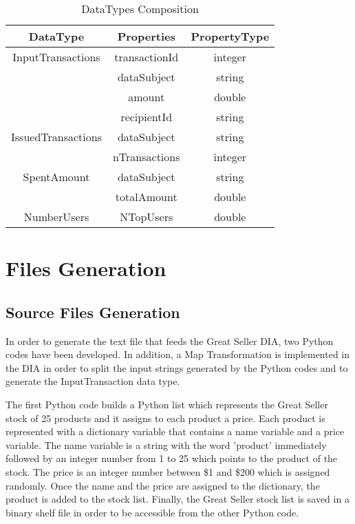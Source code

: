 \begin{table}[h!]
\centering
	\begin{tabular}{||c|c|c||} 
	\hline\hline
	DataType & Properties & PropertyType \\ [1ex] 
	\hline\hline
	InputTransactions & transactionId & integer  \\
	& dataSubject & string  \\
	& amount & double  \\
	& recipientId & string  \\
	\hline
	IssuedTransactions & dataSubject & string  \\
	& nTransactions & integer \\
	\hline
	SpentAmount & dataSubject & string  \\
	& totalAmount & double \\
	\hline
	NumberUsers & NTopUsers & double  \\
	\hline\hline
	\end{tabular}
\caption{DataTypes Composition}
\label{DataTypes Composition}
\end{table}

\section{Files Generation}

\subsection{Source Files Generation}
In order to generate the text file that feeds the Great Seller DIA, two Python codes have been developed. In addition, a Map Transformation is implemented in the DIA in order to split the input strings generated by the Python codes and to generate the InputTransaction data type.

The first Python code builds a Python list which represents the Great Seller stock of 25 products and it assigns to each product a price. Each product is represented with a dictionary variable that contains a name variable and a price variable. The name variable is a string with the word 'product' immediately followed by an integer number from 1 to 25 which points to the product of the stock. The price is an integer number between \$1 and \$200 which is assigned randomly. Once the name and the price are assigned to the dictionary, the product is added to the stock list. Finally, the Great Seller stock list is saved in a binary shelf file in order to be accessible from the other Python code.

